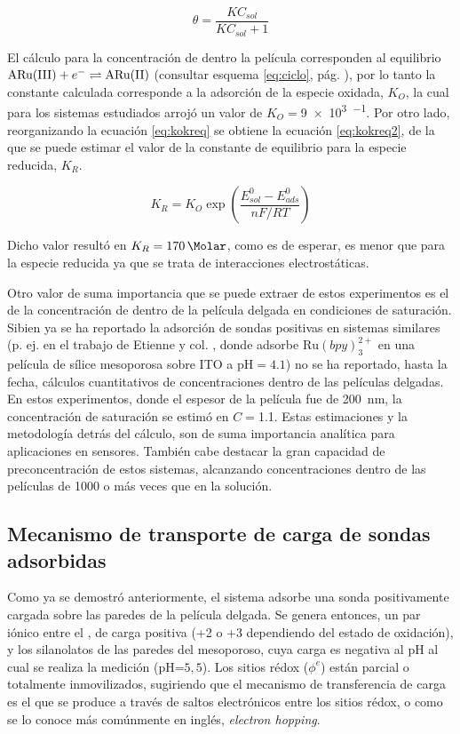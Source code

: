 			\begin{equation}
				\theta = \frac{K C_{sol}}{K C_{sol}+1}
				\label{eq:langmuir}
			\end{equation}

		
		El cálculo para la concentración de \ru\space dentro la película corresponden al equilibrio $\text{\ru(III)} + e^- \rightleftharpoons \text{\ru(II)}$ (consultar esquema \ref{eq:ciclo}, pág. \pageref{eq:ciclo}), por lo tanto la constante calculada corresponde a la adsorción de la especie oxidada, $K_O$, la cual para los sistemas estudiados arrojó un valor de $K_O=$\SI{9e3}{\Molar^{-1}}. Por otro lado, reorganizando la ecuación \ref{eq:kokreq} se obtiene la ecuación \ref{eq:kokreq2}, de la que se puede estimar el valor de la constante de equilibrio para la especie reducida, $K_R$. 
	
		\begin{equation}
				K_R=K_O \exp\left({\frac{E^0_{sol}-E^0_{ads}}{nF/RT}}\right)
				\label{eq:kokreq2}
		\end{equation}

		Dicho valor resultó en $K_R=\SI{170}{\per\Molar}$, como es de esperar, es menor que para la especie reducida ya que se trata de interacciones electrostáticas. 

		Otro valor de suma importancia que se puede extraer de estos experimentos es el de la concentración de \ru\space dentro de la película delgada en condiciones de saturación. Si\space bien ya se ha reportado la adsorción de sondas positivas en sistemas similares (p. ej. en el trabajo de Etienne y col. \cite{Etienne2007}, donde adsorbe $\text{Ru}(bpy)_3^{2+}$ en una película de sílice mesoporosa sobre ITO a $\text{pH}=4.1$) no se ha reportado, hasta la fecha, cálculos cuantitativos de concentraciones dentro de las películas delgadas. En estos experimentos, donde el espesor de la película fue de \SI{200}{nm}, la concentración de saturación se estimó en $C\!=$\SI{1.1}{\Molar}. Estas estimaciones y la metodología detrás del cálculo, son de suma importancia analítica para aplicaciones en sensores. También cabe destacar la gran capacidad de preconcentración de estos sistemas, alcanzando concentraciones dentro de las películas de 1000 o más veces que en la solución.
		
	\subsection{Mecanismo de transporte de carga de sondas adsorbidas}

	 	 Como ya se demostró anteriormente, el sistema adsorbe una sonda positivamente cargada sobre las paredes de la película delgada. Se genera entonces, un par iónico entre el \ru, de carga positiva (+2 o +3 dependiendo del estado de oxidación), y los silanolatos de las paredes del mesoporoso, cuya carga es negativa al pH al cual se realiza la medición (pH=$5,5$). Los sitios rédox ($\phi^{e}$) están parcial o totalmente inmovilizados, sugiriendo que el mecanismo de transferencia de carga es el que se produce a través de saltos electrónicos entre los sitios rédox, o como se lo conoce más comúnmente en inglés, \textit{electron hopping}. \cite{Rohlfing2005,Vila2015,Audebert2015}

